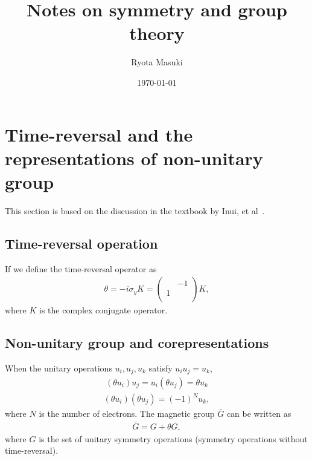 \documentclass{article}
\title{Notes on symmetry and group theory}
\author{Ryota Masuki}
\date{\today}
\begin{document}
\maketitle

\section{Time-reversal and the representations of non-unitary group}
This section is based on the discussion in the textbook by Inui, et al~\cite{inui2012group}.

\subsection{Time-reversal operation}
If we define the time-reversal operator as
\begin{align}
  \theta = - i \sigma_y K = 
  \begin{pmatrix}
     & -1 \\
    1 &  \\
  \end{pmatrix}
  K,
\end{align}
where $K$ is the complex conjugate operator.

\subsection{Non-unitary group and corepresentations}
When the unitary operations $u_i, u_j, u_k$ satisfy $u_i u_j = u_k$, 
\begin{align}
  (\theta u_i) u_j = u_i (\theta u_j) = \theta u_k
\end{align}
\begin{align}
  (\theta u_i) (\theta u_j) = (-1)^N u_k,
\end{align}
where $N$ is the number of electrons. The magnetic group $\bar{G}$ can be written as
\begin{align}
  \bar{G} = G + \theta G,
\end{align}
where $G$ is the set of unitary symmetry operations (symmetry operations without time-reversal).
\end{document}
